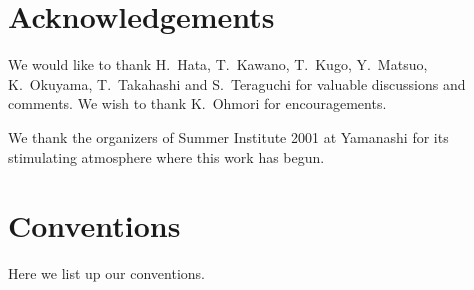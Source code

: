 \documentclass[12pt,a4paper]{article}
\begin{document}
\section*{Acknowledgements}
We would like to thank H.~Hata, T.~Kawano, T.~Kugo,  Y.~Matsuo, K.~Okuyama, T.~Takahashi and S.~Teraguchi for valuable discussions and comments.
We wish to thank K.~Ohmori for encouragements.

We thank the organizers of Summer Institute 2001 at Yamanashi
for its stimulating atmosphere where this work has begun.


\appendix

\section{Conventions}

Here we list up our conventions.
\end{document}
